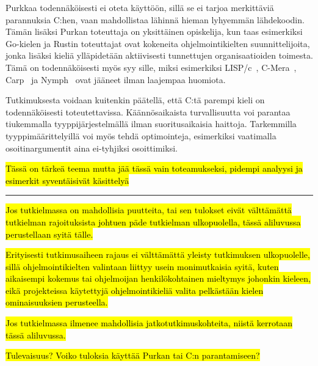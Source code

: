 Purkkaa todennäköisesti ei oteta käyttöön, sillä se ei tarjoa merkittäviä
parannuksia C:hen, vaan mahdollistaa lähinnä hieman lyhyemmän lähdekoodin.
Tämän lisäksi Purkan toteuttaja on yksittäinen opiskelija, kun taas esimerkiksi
Go-kielen ja Rustin toteuttajat ovat kokeneita ohjelmointikielten
suunnittelijoita, jonka lisäksi kieliä ylläpidetään aktiivisesti tunnettujen
organisaatioiden toimesta. Tämä on todennäköisesti myös syy sille, miksi
esimerkiksi LISP/c~\citep{clisp1}, C-Mera~\citep{clisp2}, Carp~\citep{clisp3}
ja Nymph~\citep{nymph} ovat jääneet ilman laajempaa huomiota.

Tutkimuksesta voidaan kuitenkin päätellä, että C:tä parempi kieli on
todennäköisesti toteutettavissa. Käännösaikaista turvallisuutta voi parantaa
tiukemmalla tyyppijärjestelmällä ilman suoritusaikaisia haittoja. Tarkemmilla
tyyppimäärittelyillä voi myös tehdä optimointeja, esimerkiksi vaatimalla
osoitinargumentit aina ei-tyhjiksi osoittimiksi.

\hl{Tässä on tärkeä teema mutta jää tässä vain toteamukseksi, pidempi analyysi
ja esimerkit syventäisivät käsittelyä}

\hrule

\hl{Jos tutkielmassa on mahdollisia puutteita, tai sen tulokset eivät
välttämättä tutkielman rajoituksista johtuen päde tutkielman ulkopuolella,
tässä aliluvussa perustellaan syitä tälle.}

\hl{Erityisesti tutkimusaiheen rajaus ei välttämättä yleisty tutkimuksen
ulkopuolelle, sillä ohjelmointikielten valintaan liittyy usein monimutkaisia
syitä, kuten aikaisempi kokemus tai ohjelmoijan henkilökohtainen mieltymys
johonkin kieleen, eikä projekteissa käytettyjä ohjelmointikieliä valita
pelkästään kielen ominaisuuksien perusteella.}

\hl{Jos tutkielmassa ilmenee mahdollisia jatkotutkimuskohteita, niistä
kerrotaan tässä aliluvussa.}

\hl{Tulevaisuus? Voiko tuloksia käyttää Purkan tai C:n parantamiseen?}
